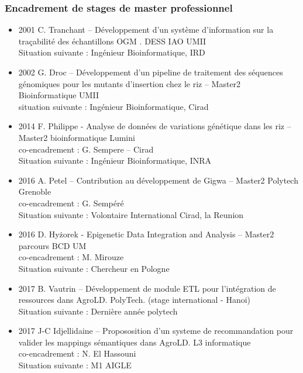 \subsubsection*{Encadrement de stages de master professionnel}
\begin{itemize}
\item 2001 C. Tranchant – Développement d’un système d’information sur la traçabilité des échantillons OGM . DESS IAO UMII \\
Situation suivante : Ingénieur Bioinformatique, IRD

\item 2002 G. Droc – Développement d’un pipeline de traitement des séquences génomiques pour les mutants d’insertion chez le riz – Master2 Bioinformatique UMII\\
situation suivante : Ingénieur Bioinformatique, Cirad

\item 2014 F. Philippe -  Analyse de données de variations génétique dans les riz – Master2 bioinformatique Lumini \\
co-encadrement : G. Sempere – Cirad \\
Situation suivante : Ingénieur Bioinformatique, INRA

\item 2016 A. Petel – Contribution au développement de Gigwa – Master2 Polytech Grenoble \\
co-encadrement : G. Sempéré \\
Situation suivante : Volontaire International Cirad, la Reunion

\item 2016 D. Hyżorek - Epigenetic Data Integration and Analysis – Master2 parcours BCD UM \\
co-encadrement : M. Mirouze \\
Situation suivante : Chercheur en Pologne

\item 2017 B. Vautrin – Développement de module ETL pour l’intégration de ressources dans AgroLD. PolyTech. (stage international - Hanoi) \\
Situation suivante : Dernière année polytech 

\item 2017 J-C Idjellidaine – Propososition d’un systeme de recommandation pour valider les mappings sémantiques dans AgroLD. L3 informatique \\
co-encadrement : N. El Hassouni \\
Situation suivante : M1 AIGLE 
\end{itemize}

